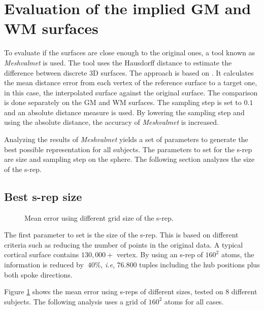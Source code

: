 \section{Evaluation of the implied GM and WM surfaces}
\label{sec:Evaluation}

To evaluate if the surfaces are close enough to the original ones, 
a tool known as \textit{Meshvalmet} is used.
The tool uses the Hausdorff distance to estimate the difference between discrete 3D surfaces. 
The approach is based on \cite{aspert_mesh:_2002}. It
calculates the mean distance error from each vertex of the reference surface to 
a target one, in this case, the interpolated surface against the original surface. 
The comparison is done separately on the GM and WM surfaces.
The sampling step is set to $0.1$ and an absolute distance measure is used.
By lowering the sampling step and using the 
absolute distance, the accuracy of \textit{Meshvalmet} is increased.

Analyzing the results of \textit{Meshvalmet} 
yields a set of parameters to generate the best possible representation 
for all subjects. 
The parameters to set for the s-rep are size and sampling step on the sphere.
The following section analyzes the size of the s-rep.

\subsection{Best s-rep size}
\label{sec:s-repsize}

\begin{figure}[!h]
 \centering 
 \caption[GM and WM surface mean error: grid size.]{Mean error using different grid size of the s-rep.}
 \label{fig:GridSize} 
\end{figure}

The first parameter to set is the size of the s-rep. This is based on different criteria
such as reducing the number of points in the original data. A typical cortical surface contains $130,000+$ vertex.
By using an s-rep of $160^2$ atoms, the information is reduced by $~40\%$, \textit{i.e}, 
$76.800$ tuples including the hub positions plus both spoke directions.

Figure \ref{fig:GridSize} shows the mean error using s-reps of different sizes, tested on 8 different subjects. 
The following analysis uses a grid of $160^2$ atoms for all cases.

